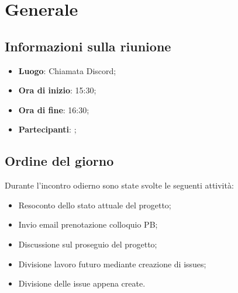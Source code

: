 \section{Generale}

\vspace{10pt}


\subsection{Informazioni sulla riunione}
\begin{itemize}
	\item \textbf{Luogo}: Chiamata Discord;
	\item \textbf{Ora di inizio}: 15:30;
	\item \textbf{Ora di fine}: 16:30;
	\item \textbf{Partecipanti}: \team;
\end{itemize}

\vspace{5pt}

\subsection{Ordine del giorno}

Durante l'incontro odierno sono state svolte le seguenti attività:
\begin{itemize}
	\item Resoconto dello stato attuale del progetto;
	\item Invio email prenotazione colloquio PB; 
	\item Discussione sul proseguio del progetto;
	\item Divisione lavoro futuro mediante creazione di issues;
	\item Divisione delle issue appena create.
\end{itemize}

